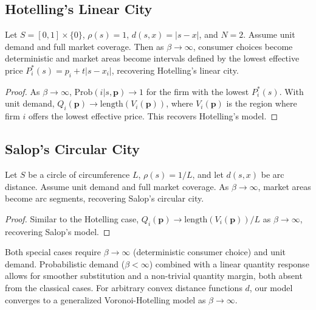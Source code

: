 \documentclass{article}
\begin{document}
\subsection{Hotelling's Linear City}

\begin{proposition}
  \label{prop:hotelling}
  Let $S = [0,1]\times\{0\}$, $\rho(s)=1$, $d(s,x)=|s-x|$, and $N=2$. Assume unit demand and full market coverage. Then as $\beta\to\infty$, consumer choices become deterministic and market areas become intervals defined by the lowest effective price $P_i^*(s)=p_i+t|s-x_i|$, recovering Hotelling's linear city.
\end{proposition}

\begin{proof}
  As $\beta \to \infty$, $\mathrm{Prob}(i|s,\mathbf{p}) \to 1$ for the firm with the lowest $P_i^*(s)$. With unit demand, $Q_i(\mathbf{p}) \to \text{length}(V_i(\mathbf{p}))$, where $V_i(\mathbf{p})$ is the region where firm $i$ offers the lowest effective price. This recovers Hotelling's model.
\end{proof}

\subsection{Salop's Circular City}

\begin{proposition}
  \label{prop:salop}
  Let $S$ be a circle of circumference $L$, $\rho(s)=1/L$, and let $d(s,x)$ be arc distance. Assume unit demand and full market coverage. As $\beta\to\infty$, market areas become arc segments, recovering Salop's circular city.
\end{proposition}

\begin{proof}
  Similar to the Hotelling case, $Q_i(\mathbf{p}) \to \text{length}(V_i(\mathbf{p}))/L$ as $\beta \to \infty$, recovering Salop's model.
\end{proof}

\begin{remark}
  Both special cases require $\beta \to \infty$ (deterministic consumer choice) and unit demand. Probabilistic demand ($\beta < \infty$) combined with a linear quantity response allows for smoother substitution and a non-trivial quantity margin, both absent from the classical cases. For arbitrary convex distance functions $d$, our model converges to a generalized Voronoi-Hotelling model as $\beta \to \infty$.
\end{remark}
\end{document}
